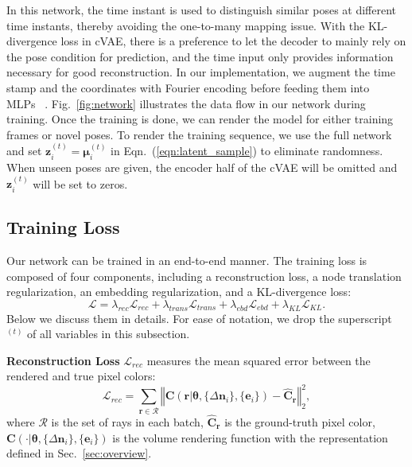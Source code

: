 In this network, the time instant is used to distinguish similar poses at different time instants, thereby avoiding the one-to-many mapping issue. With the KL-divergence loss in cVAE, there is a preference to let the decoder to mainly rely on the pose condition for prediction, and the time input only provides information necessary for good reconstruction.  
In our implementation, we augment the time stamp and the coordinates with Fourier encoding before feeding them into MLPs~\cite{mildenhall2020nerf} . Fig.~\ref{fig:network} illustrates the data flow in our network during training. Once the training is done, we can render the model for either training frames or novel poses. To render the training sequence, we use the full network and set $\bm{z}_i^{(t)} = \bm{\mu}_i^{(t)}$ in Eqn.~(\ref{eqn:latent_sample}) to eliminate randomness. When unseen poses are given, the encoder half of the cVAE will be omitted and $\bm{z}_i^{(t)}$ will be set to zeros. 


\subsection{Training Loss}
\label{sec:method:loss}
Our network can be trained in an end-to-end manner. 
The training loss is composed of four components, including a reconstruction loss, a node translation regularization, an embedding regularization, and a KL-divergence loss:
\begin{equation}
     \mathcal{L} = \lambda_{rec}\mathcal{L}_{rec} + \lambda_{trans}\mathcal{L}_{trans} + \lambda_{ebd}\mathcal{L}_{ebd} + \lambda_{KL}\mathcal{L}_{KL}.
\end{equation}
Below we discuss them in details. For ease of notation, we drop the superscript ${}^{(t)}$ of all variables in this subsection. 

\textbf{Reconstruction Loss} $\mathcal{L}_{rec}$ measures the mean squared error between the rendered and true pixel colors:
\begin{equation}
    \mathcal{L}_{rec} = \sum_{\bm{r}\in\mathcal{R}} \left\Vert \bm{C}\left(\bm{r} | \bm{\theta}, \{\Delta\bm{n}_i\}, \{\bm{e}_i\}\right) - \hat{\bm{C}}_{\bm{r}}  \right\Vert_2^2, 
\end{equation}
where $\mathcal{R}$ is the set of rays in each batch, $\hat{\bm{C}}_{\bm{r}}$ is the ground-truth pixel color, $\bm{C}(\cdot | \bm{\theta}, \{\Delta\bm{n}_i\}, \{\bm{e}_i\})$ is the volume rendering function with the representation defined in Sec.~\ref{sec:overview}. 

